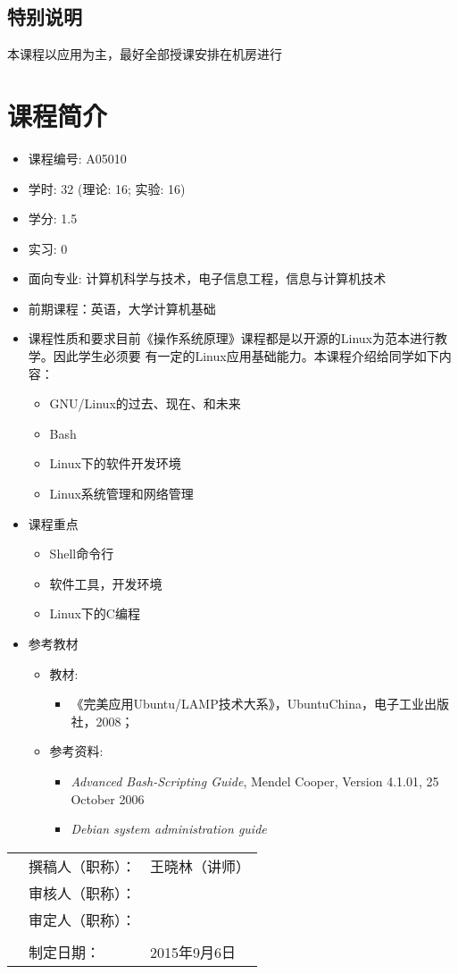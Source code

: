 \documentclass[12pt,a4paper]{article}
\begin{document}
\subsection{特别说明}
本课程以应用为主，最好全部授课安排在机房进行
  
\section{课程简介}

\begin{itemize}
\item 课程编号: A05010
\item 学时: 32 (理论: 16; 实验: 16)
\item 学分: 1.5
\item 实习: 0
\item 面向专业: 计算机科学与技术，电子信息工程，信息与计算机技术
\item 前期课程：英语，大学计算机基础
\item 课程性质和要求目前《操作系统原理》课程都是以开源的Linux为范本进行教学。因此学生必须要
  有一定的Linux应用基础能力。本课程介绍给同学如下内容：
  \begin{itemize}
  \item GNU/Linux的过去、现在、和未来
  \item Bash
  \item Linux下的软件开发环境
  \item Linux系统管理和网络管理
  \end{itemize}
\item 课程重点
  \begin{itemize}
  \item Shell命令行
  \item 软件工具，开发环境
  \item Linux下的C编程
  \end{itemize}
\item 参考教材
  \begin{itemize}
  \item 教材:
    \begin{itemize}
    \item 《完美应用Ubuntu/LAMP技术大系》，UbuntuChina，电子工业出版社，2008；
    \end{itemize}
  \item 参考资料:
    \begin{itemize}
    \item \emph{Advanced Bash-Scripting Guide}, Mendel Cooper, Version 4.1.01, 25 October
      2006
    \item \emph{Debian system administration guide}
    \end{itemize}
  \end{itemize}
\end{itemize}

\vspace{10em}
\begin{table}[h]
  \begin{tabular}{p{20em}ll}
    &撰稿人（职称）：&王晓林（讲师）\\
    &审核人（职称）：&\\
    &审定人（职称）：&\\
    &&\\
    &制定日期：&2015年9月6日\\
  \end{tabular}
\end{table}
\end{document}
